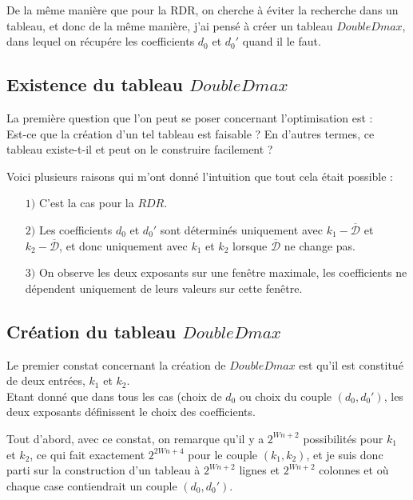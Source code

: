 \documentclass[12pt, a4paper]{memoir}
\newcommand{\dbarre}{\overline{\mathcal{D}}}
\begin{document}
      De la même manière que pour la RDR, on cherche à éviter la recherche dans un tableau, et donc de la même manière, j'ai pensé à 
      créer un tableau $DoubleDmax$, dans lequel on récupére les coefficients $d_0$ et $d_0'$ quand il le faut.
    
    \subsection{Existence du tableau $DoubleDmax$}
    
      La première question que l'on peut se poser concernant l'optimisation est : \\
      Est-ce que la création d'un tel tableau est faisable ? En d'autres termes, ce tableau existe-t-il et peut on
      le construire facilement ?
	    
      Voici plusieurs raisons qui m'ont donné l'intuition que tout cela était possible : \\
      \begin{itemize}
      \item [$1)$] C'est la cas pour la $RDR$.
      \item [$2)$] Les coefficients $d_0$ et $d_0'$ sont déterminés uniquement avec $k_1 - \dbarre$ et $k_2 - \dbarre$, et donc uniquement
      avec $k_1$ et $k_2$ lorsque $\dbarre$ ne change pas.
      \item [$3)$] On observe les deux exposants sur une fenêtre maximale, les coefficients ne dépendent uniquement
      de leurs valeurs sur cette fenêtre.
      \end{itemize}

    \subsection{Création du tableau $DoubleDmax$}   
   
      Le premier constat concernant la création de $DoubleDmax$ est qu'il est constitué de deux entrées, $k_1$ et $k_2$. \\
      Etant donné que dans tous les cas (choix de $d_0$ ou choix du couple $(d_0, d_0')$, les deux exposants définissent
      le choix des coefficients.

      Tout d'abord, avec ce constat, on remarque qu'il y a $2^{Wn+2}$ possibilités pour $k_1$ et $k_2$, ce qui fait exactement
      $2^{2Wn+4}$ pour le couple $(k_1,k_2)$, et je suis donc parti sur la construction d'un tableau à $2^{Wn+2}$ lignes et 
      $2^{Wn+2}$ colonnes et où chaque case contiendrait un couple $(d_0,d_0')$.
	
\end{document}
